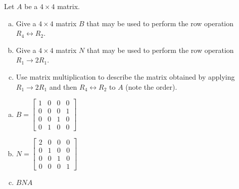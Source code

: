 
\begin{exerciseStatement}


Let \(A\) be a \(4 \times 4\) matrix.


\begin{enumerate}[(a)]
\item Give a \(4 \times 4\) matrix \(B\) that may be used to perform the row operation \( R_4 \leftrightarrow R_2 \).
\item Give a \(4 \times 4\) matrix \(N\) that may be used to perform the row operation \( R_1 \to 2R_1 \).
\item Use matrix multiplication to describe the matrix obtained by applying \( R_1 \to 2R_1 \) and then \( R_4 \leftrightarrow R_2 \) to \(A\) (note the order). 
\end{enumerate}
    
\end{exerciseStatement}
    
\begin{exerciseAnswer} 

\begin{enumerate}[(a)]
\item \(B= \left[\begin{array}{cccc}
1 & 0 & 0 & 0 \\
0 & 0 & 0 & 1 \\
0 & 0 & 1 & 0 \\
0 & 1 & 0 & 0
\end{array}\right] \)
\item \(N= \left[\begin{array}{cccc}
2 & 0 & 0 & 0 \\
0 & 1 & 0 & 0 \\
0 & 0 & 1 & 0 \\
0 & 0 & 0 & 1
\end{array}\right] \)
\item \(BNA\)
\end{enumerate}
    
\end{exerciseAnswer}
    
